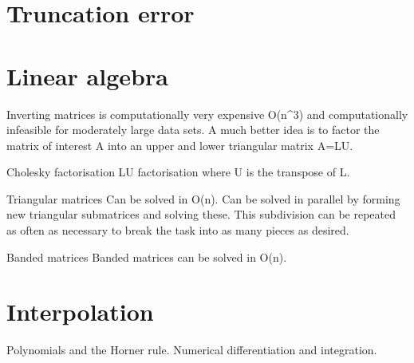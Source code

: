 \documentclass{amsart}
\begin{document}
\section{Truncation error}

\section{Linear algebra}
Inverting matrices is computationally very expensive O(n^3) and computationally
infeasible for moderately large data sets. A much better idea is to factor
the matrix of interest A into an upper and lower triangular matrix A=LU.

Cholesky factorisation
LU factorisation where U is the transpose of L.

Triangular matrices
Can be solved in O(n). Can be solved in parallel by forming new triangular
submatrices and solving these. This subdivision can be repeated as often as
necessary to break the task into as many pieces as desired.

Banded matrices
Banded matrices can be solved in O(n).

\section{Interpolation}
Polynomials and the Horner rule.
Numerical differentiation and integration.
\end{document}
